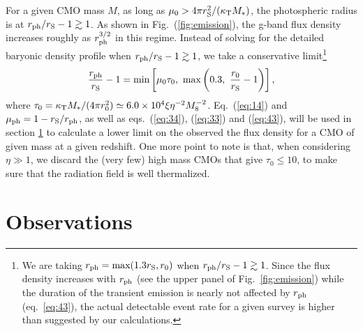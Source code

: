 \documentclass[useAMS,usenatbib]{mn2e}
\begin{document}
For a given CMO mass $M$, as long as $\mu_0> 4\pi r_{\rm
  S}^2/(\kappa_{\rm T}M_*)$, the photospheric radius is at $r_{\rm
  ph}/r_{\rm S} - 1\gtrsim 1$. As 
shown in Fig.~(\ref{fig:emission}), the g-band flux density increases
roughly as $r_{\rm ph}^{3/2}$ in this regime. Instead of solving for the detailed
baryonic density profile when $r_{\rm ph}/r_{\rm S} - 1\gtrsim 1$, we
take a conservative limit\footnote{We are taking $r_{\rm ph} =
  \mbox{max}(1.3r_{\rm S}, r_0)$ when $r_{\rm ph}/r_{\rm S} - 1\gtrsim
  1$. Since the flux density increases with $r_{\rm ph}$ (see
  the upper panel of Fig.~\ref{fig:emission}) while the
  duration of the transient emission is nearly not affected by $r_{\rm ph}$
  (eq.~\ref{eq:43}), the actual detectable event rate for a given
  survey is higher than suggested by our calculations.}
\begin{equation}
  \label{eq:14}
  \frac{r_{\rm ph}}{r_{\rm S}} - 1 = \mbox{min}\left[\mu_0\tau_0,\
  \mbox{max}\left(0.3,~\frac{r_0}{r_{\rm S}}-1\right)\right], 
\end{equation}
where $\tau_0 = \kappa_{\rm T} M_*/(4\pi r_0^2)\simeq
6.0\times10^4 \xi\eta^{-2} M_8^{-2}$.
Eq.~(\ref{eq:14}) and $\mu_{\rm ph} = 1 - r_{\rm S}/r_{\rm
  ph}$, as well as eqs.~(\ref{eq:34}), (\ref{eq:33}) and (\ref{eq:43}), will be
used in section \ref{sec:rate} to calculate a  
lower limit on the observed the flux density for a CMO of given mass at a given
redshift. One more point to note is that, when considering
$\eta\gg1$, we discard the (very few) high mass CMOs that give $\tau_0 
\leq 10$, to make sure that the radiation field is well
thermalized. 
\section{Observations}\label{sec:rate}
\end{document}
